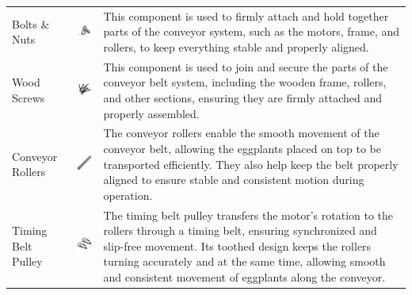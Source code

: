 {\begin{longtable}{
		>{\centering\arraybackslash}m{3cm}  
		>{\centering\arraybackslash}m{4cm} 
		>{\arraybackslash}m{6cm}
	}
	Bolts \& Nuts & \includegraphics[width=3cm]{figures/bolts_nuts} &
	This component is used to firmly attach and hold together parts of the conveyor system, such as the motors, frame, and rollers, to keep everything stable and properly aligned. \\
	
	Wood Screws & \includegraphics[width=3cm]{figures/screws} &
	This component is used to join and secure the parts of the conveyor belt system, including the wooden frame, rollers, and other sections, ensuring they are firmly attached and properly assembled. \\
	
	Conveyor Rollers &
	\includegraphics[width=3cm]{figures/conveyor_roller} &
	The conveyor rollers enable the smooth movement of the conveyor belt, allowing the eggplants placed on top to be transported efficiently. They also help keep the belt properly aligned to ensure stable and consistent motion during operation. \\
	
	Timing Belt Pulley &
	\includegraphics[width=3cm]{figures/timing_belt_pulley} &
	The timing belt pulley transfers the motor’s rotation to the rollers through a timing belt, ensuring synchronized and slip-free movement. Its toothed design keeps the rollers turning accurately and at the same time, allowing smooth and consistent movement of eggplants along the conveyor. \\
	

\end{longtable}}
